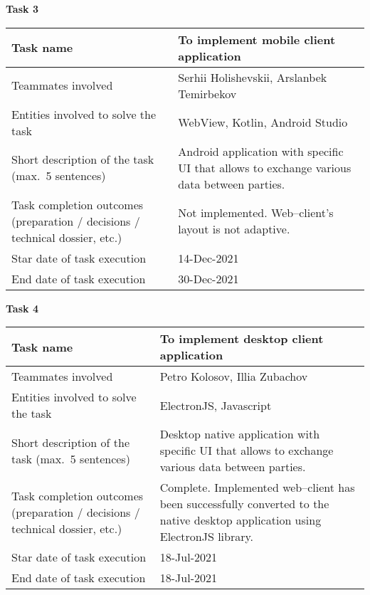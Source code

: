\vskip 5mm
\hspace*{-6mm}\textbf{Task 3}\\
\begin{tabular}{|p{}|p{}|}
    \hline
    Task name                           & To implement mobile client application                                                     \\
    \hline
    Teammates involved                  & Serhii Holishevskii, Arslanbek Temirbekov                                                  \\
    \hline
    Entities involved to solve the task & WebView, Kotlin, Android Studio                                                            \\
    \hline
    Short description of the task (max.\ 5 sentences)
    & Android application with specific UI that allows to exchange various data between parties. \\
    \hline
    Task completion outcomes  (preparation / decisions / technical dossier, etc.) & Not implemented.
    Web--client's layout is not adaptive. \\
    \hline
    Star date of task execution         & 14-Dec-2021                                                                                \\
    \hline
    End date of task execution          & 30-Dec-2021                                                                                \\
    \hline
\end{tabular}
\vskip 5mm
\hspace*{-6mm}\textbf{Task 4}\\
\begin{tabular}{|p{}|p{}|}
    \hline
    Task name                           & To implement desktop client application                                                           \\
    \hline
    Teammates involved                  & Petro Kolosov, Illia Zubachov                                                                     \\
    \hline
    Entities involved to solve the task & ElectronJS, Javascript                                                                            \\
    \hline
    Short description of the task (max.\ 5 sentences)
    & Desktop native application with specific UI that allows to exchange various data between parties. \\
    \hline
    Task completion outcomes (preparation / decisions / technical dossier, etc.) & Complete.
    Implemented web--client has been successfully converted to
    the native desktop application using ElectronJS library. \\
    \hline
    Star date of task execution         & 18-Jul-2021                                                                                       \\
    \hline
    End date of task execution          & 18-Jul-2021                                                                                       \\
    \hline
\end{tabular}
